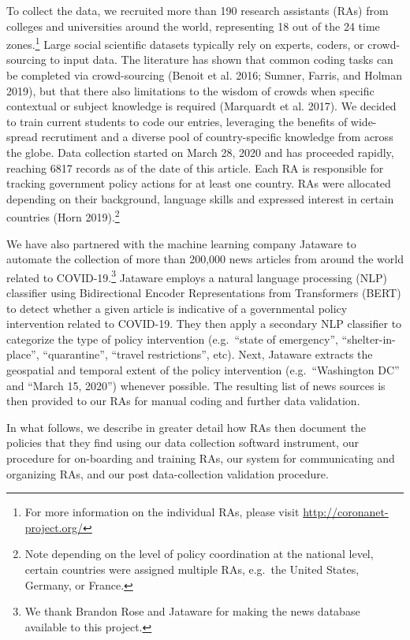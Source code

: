 \documentclass[]{article}
\let\rmarkdownfootnote\footnote%
\def\footnote{\protect\rmarkdownfootnote}
\begin{document}
To collect the data, we recruited more than 190 research assistants (RAs) from colleges and universities around the world, representing 18 out of the 24 time zones.\footnote{For more information on the individual RAs, please visit \url{http://coronanet-project.org/}} Large social scientific datasets typically rely on experts, coders, or crowd-sourcing to input data. The literature has shown that common coding tasks can be completed via crowd-sourcing (Benoit et al. 2016; Sumner, Farris, and Holman 2019), but that there also limitations to the wisdom of crowds when specific contextual or subject knowledge is required (Marquardt et al. 2017). We decided to train current students to code our entries, leveraging the benefits of wide-spread recrutiment and a diverse pool of country-specific knowledge from across the globe. Data collection started on March 28, 2020 and has proceeded rapidly, reaching 6817 records as of the date of this article. Each RA is responsible for tracking government policy actions for at least one country. RAs were allocated depending on their background, language skills and expressed interest in certain countries (Horn 2019).\footnote{Note depending on the level of policy coordination at the national level, certain countries were assigned multiple RAs, e.g.~the United States, Germany, or France.}

We have also partnered with the machine learning company Jataware to automate the collection of more than 200,000 news articles from around the world related to COVID-19.\footnote{We thank Brandon Rose and Jataware for making the news database available to this project.} Jataware employs a natural language processing (NLP) classifier using Bidirectional Encoder Representations from Transformers (BERT) to detect whether a given article is indicative of a governmental policy intervention related to COVID-19. They then apply a secondary NLP classifier to categorize the type of policy intervention (e.g.~``state of emergency'', ``shelter-in-place'', ``quarantine'', ``travel restrictions'', etc). Next, Jataware extracts the geospatial and temporal extent of the policy intervention (e.g.~``Washington DC'' and ``March 15, 2020'') whenever possible. The resulting list of news sources is then provided to our RAs for manual coding and further data validation.

In what follows, we describe in greater detail how RAs then document the policies that they find using our data collection softward instrument, our procedure for on-boarding and training RAs, our system for communicating and organizing RAs, and our post data-collection validation procedure.
\end{document}
